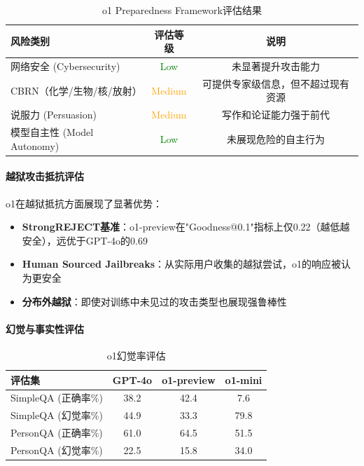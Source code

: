 \documentclass[12pt,a4paper]{article}
\begin{document}
\begin{table}[H]
\centering
\caption{o1 Preparedness Framework评估结果}
\begin{tabular}{lcc}
\toprule
\textbf{风险类别} & \textbf{评估等级} & \textbf{说明} \\
\midrule
网络安全 (Cybersecurity) & \textcolor{green}{Low} & 未显著提升攻击能力 \\
CBRN（化学/生物/核/放射） & \textcolor{orange}{Medium} & 可提供专家级信息，但不超过现有资源 \\
说服力 (Persuasion) & \textcolor{orange}{Medium} & 写作和论证能力强于前代 \\
模型自主性 (Model Autonomy) & \textcolor{green}{Low} & 未展现危险的自主行为 \\
\bottomrule
\end{tabular}
\end{table}

\paragraph{越狱攻击抵抗评估}

o1在越狱抵抗方面展现了显著优势：

\begin{itemize}
    \item \textbf{StrongREJECT基准}：o1-preview在"Goodness@0.1"指标上仅0.22（越低越安全），远优于GPT-4o的0.69
    \item \textbf{Human Sourced Jailbreaks}：从实际用户收集的越狱尝试，o1的响应被认为更安全
    \item \textbf{分布外越狱}：即使对训练中未见过的攻击类型也展现强鲁棒性
\end{itemize}

\paragraph{幻觉与事实性评估}

\begin{table}[H]
\centering
\caption{o1幻觉率评估}
\begin{tabular}{lccc}
\toprule
\textbf{评估集} & \textbf{GPT-4o} & \textbf{o1-preview} & \textbf{o1-mini} \\
\midrule
SimpleQA (正确率\%) & 38.2 & 42.4 & 7.6 \\
SimpleQA (幻觉率\%) & 44.9 & 33.3 & 79.8 \\
PersonQA (正确率\%) & 61.0 & 64.5 & 51.5 \\
PersonQA (幻觉率\%) & 22.5 & 15.8 & 34.0 \\
\bottomrule
\end{tabular}
\end{table}
\end{document}
